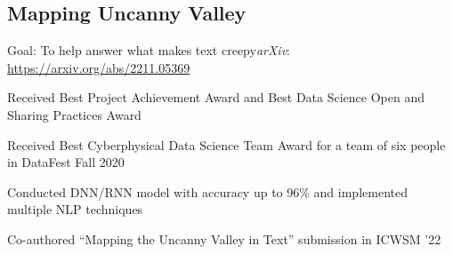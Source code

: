 \documentclass[11pt]{article}
\begin{document}
\subsection*{Mapping Uncanny Valley \hfill {}}
\noindent
Goal: To help answer what makes text creepy\hfill \textit{arXiv}: \href{https://arxiv.org/abs/2211.05369}{https://arxiv.org/abs/2211.05369}
\begin{compactitem}
    \item Received Best Project Achievement Award and Best Data Science Open and
    Sharing Practices Award
    \item Received Best Cyberphysical Data Science Team Award for a team of six people
    in DataFest Fall 2020
    \item Conducted DNN/RNN model with accuracy up to 96\% and implemented
    multiple NLP techniques
    \item Co-authored ``Mapping the Uncanny Valley in Text'' submission in
    ICWSM '22
\end{compactitem}


\end{document}
